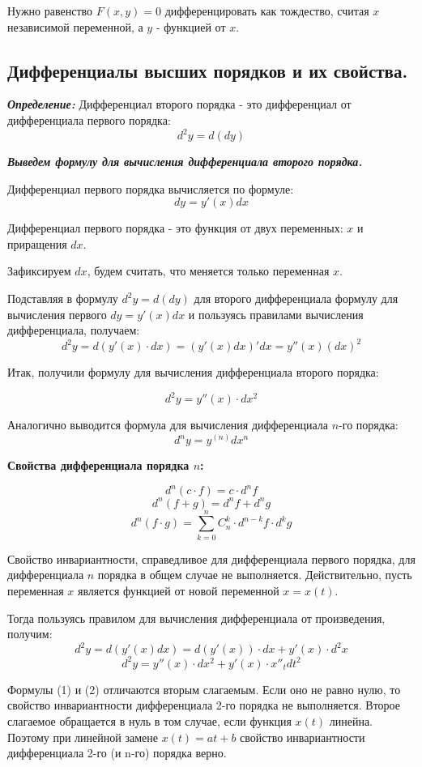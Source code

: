 \documentclass[a4paper,12pt]{article}
\theoremstyle{plain} %
\theoremstyle{definition} %
\theoremstyle{remark} %
\begin{document}
Нужно равенство $F(x, y) = 0$ дифференцировать как тождество, считая $x$ независимой переменной, а $y$ - функцией от $x$.



\newpage
\subsection*{Дифференциалы высших порядков и их свойства.                                               }
\textit{\textbf{Определение:}} Дифференциал второго порядка - это дифференциал от дифференциала первого порядка:
\[
	d^2y = d(dy)
\]

\textbf{\textit{Выведем формулу для вычисления дифференциала второго порядка.}}

Дифференциал первого порядка вычисляется по формуле:
\[
	dy = y'(x) dx
\]

Дифференциал первого порядка - это функция от двух переменных: $x$ и приращения $dx$.

Зафиксируем $dx$, будем считать, что меняется только переменная $x$.

Подставляя в формулу $d^2y = d(dy)$ для второго дифференциала формулу для вычисления первого $dy = y'(x)dx$ и пользуясь правилами вычисления дифференциала, получаем:
\[
	d^2y = d(y'(x) \cdot dx) = (y'(x)dx)'dx = y''(x)(dx)^2
\]

Итак, получили формулу для вычисления дифференциала второго порядка:

\[
	d^2y = y''(x) \cdot dx^2
\]

Аналогично выводится формула для вычисления дифференциала $n$-го порядка:
\[
	d^ny = y^{(n)}dx^n
\]

\textbf{Свойства дифференциала порядка $n$:}

\[
	d^n(c\cdot f) = c\cdot d^n f
\]
\[
	d^n(f + g) = d^nf + d^ng
\]
\[
	d^n(f\cdot g) = \sum_{k = 0}^n C_n^k \cdot d^{n-k}f \cdot d^k g
\]

Свойство инвариантности, справедливое для дифференциала первого порядка, для дифференциала $n$ порядка в общем случае не выполняется. Действительно, пусть переменная $x$ является функцией от новой переменной $x = x(t)$.

Тогда пользуясь правилом для вычисления дифференциала от произведения, получим:
\[
	d^2y = d(y'(x)dx) = d(y'(x)) \cdot dx + y'(x) \cdot d^2x
\]
\[
	d^2y = y''(x) \cdot dx^2 + y'(x) \cdot x''_t dt^2
\]

Формулы (1) и (2) отличаются вторым слагаемым. Если оно не равно нулю, то свойство инвариантности дифференциала 2-го порядка не выполняется. Второе слагаемое обращается в нуль в том случае, если функция $x(t)$ линейна. Поэтому при линейной замене $x(t) = at + b$ свойство инвариантности дифференциала 2-го (и n-го) порядка верно.
\end{document}
